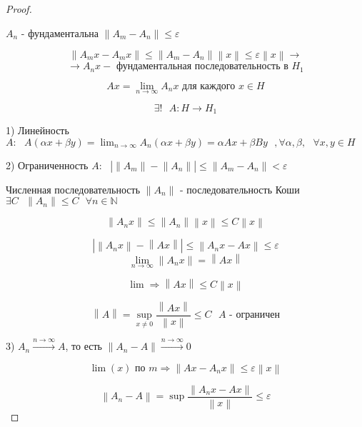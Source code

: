 \documentclass[12pt, a4paper]{report}
\begin{document}
\begin{proof} \(  \) 

    \( A_n \) - фундаментальна \( \left\lVert A_{m} - A_n  \right\rVert \le \varepsilon \) 

    \[ \left\lVert A_m x -A_m x \right\rVert \le \left\lVert A_m -A_n \right\rVert \left\lVert x \right\rVert \le \varepsilon \left\lVert x \right\rVert \to   \tag{\(*  \) }\] 
    \[ \to  A_n x - \text{ фундаментальная последовательность в }  H_1 \]

    \[ Ax = \lim_{n  \to \infty} A_n x \text{ для каждого } x \in H   \]  

    \[ \exists ! \text{ }  A : H \to  H_1  \] 

    1) Линейность \( A :  \text{ } A(\alpha x + \beta y ) = \displaystyle \lim_{n \to \infty} A_n (\alpha x + \beta y) = \alpha A x + \beta B y  \text{ }  , \forall  \alpha , \beta , \text{ }  \forall  x, y \in H \) 

    2) Ограниченность \( A :\text{ } \left\lvert  \left\lVert A_m  \right\rVert - \left\lVert A_n \right\rVert \right\rvert \le \left\lVert A_m -A_n \right\rVert < \varepsilon   \) 

    Численная последовательность \( \left\lVert A_n \right\rVert \) - последовательность Коши \( \exists  C \text{ }  \left\lVert A_n \right\rVert \le C \text{ }  \forall  n \in \mathbb{N} \)
    
    \[ \left\lVert A_n x  \right\rVert \le \left\lVert A_n  \right\rVert \left\lVert x \right\rVert \le C \left\lVert x \right\rVert \] 

    \[ \left\lvert \left\lVert A_n x  \right\rVert - \left\lVert A x \right\rVert \right\rvert \le \left\lVert A_n x - Ax  \right\rVert \le \varepsilon  \]
    \[ \lim_{n  \to \infty} \left\lVert A_n x  \right\rVert = \left\lVert Ax  \right\rVert \]  

    \[ \lim  \Rightarrow \left\lVert Ax  \right\rVert \le C \left\lVert x  \right\rVert \] 

    \[ \left\lVert A \right\rVert = \sup _{x \neq 0}  \frac{\left\lVert A x \right\rVert}{\left\lVert x \right\rVert} \le C \text{ }  A\text{ - ограничен}  \] 

    3) \( A_n \xrightarrow{n \to  \infty } A    \), то есть \( \left\lVert A_n -A \right\rVert \xrightarrow{ n \to  \infty }  0 \) 

    \[ \lim (x) \text{ по } m \Rightarrow \left\lVert Ax - A_n x \right\rVert \le \varepsilon \left\lVert x \right\rVert  \] 

    \[ \left\lVert A_n -A  \right\rVert = \sup  \frac{\left\lVert A_n x - Ax  \right\rVert}{\left\lVert x \right\rVert} \le  \varepsilon  \] 

\end{proof}
\end{document}
